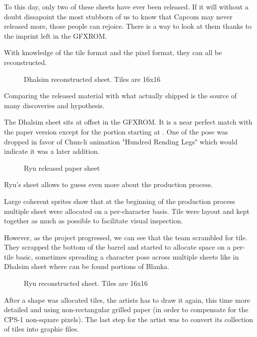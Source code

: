 To this day, only two of these sheets have ever been released\cite{ffdevinterview}\cite{htmcc}. If it will without a doubt dissapoint the most stubborn of us to know that Capcom may never released more, those people can rejoice. There is a way to look at them thanks to the imprint left in the GFXROM. 

With knowledge of the tile format and the pixel format, they can all be reconstructed.




 \begin{figure}[H]
\caption*{Dhalsim reconstructed sheet. Tiles are 16x16}
\end{figure}

Comparing the released material with what actually shipped is the source of many discoveries and hypothesis. 


The Dhalsim sheet sits at offset  in the GFXROM. It is a near perfect match with the paper version except for the portion starting at . One of the pose was dropped in favor of Chun-li animation "Hundred Rending Legs" which would indicate it was a later addition. 

 \begin{figure}[H]
\caption*{Ryu released paper sheet}
\end{figure}

Ryu's sheet  allows to guess even more about the production process. 

Large coherent sprites show that at the beginning of the production process multiple sheet were allocated on a per-character basis. Tile were layout and kept together as much as possible to facilitate visual inspection.

However, as the project progressed, we can see that the team scrambled for tile. They scrapped the bottom of the barrel and started to allocate space on a per-tile basic, sometimes spreading a character pose across multiple sheets like in Dhalsim sheet where can be found portions of Blanka.

 \begin{figure}[H]
\caption*{Ryu reconstructed sheet. Tiles are 16x16}
\end{figure}


After a shape was allocated tiles, the artists has to draw it again, this time more detailed and using non-rectangular grilled paper (in order to compensate for the CPS-1 non-square pixels). The last step for the artist was to convert its collection of tiles into graphic files. 

